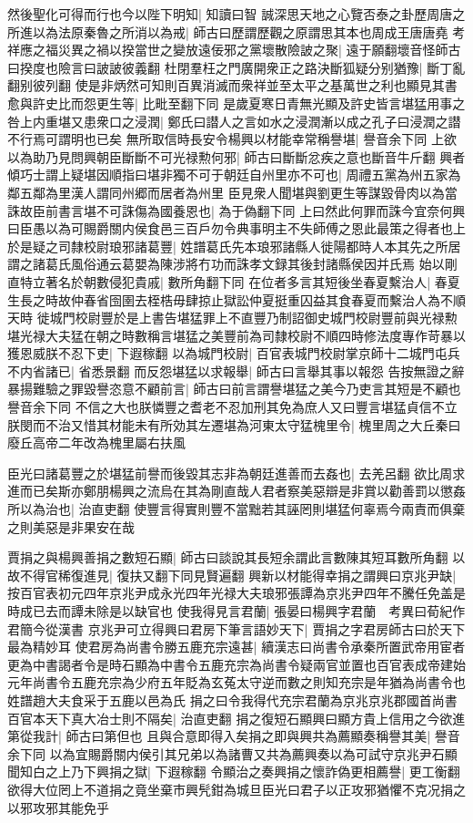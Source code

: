 然後聖化可得而行也今以陛下明知|{
	知讀曰智}
誠深思天地之心覽否泰之卦歷周唐之所進以為法原秦魯之所消以為戒|{
	師古曰歷謂歷觀之原謂思其本也周成王唐唐堯}
考祥應之福災異之禍以揆當世之變放遠佞邪之黨壞散險詖之聚|{
	遠于願翻壞音怪師古曰揆度也險言曰詖詖彼義翻}
杜閉羣枉之門廣開衆正之路決斷狐疑分别猶豫|{
	斷丁亂翻别彼列翻}
使是非炳然可知則百異消滅而衆祥並至太平之基萬世之利也顯見其書愈與許史比而怨更生等|{
	比毗至翻下同}
是歲夏寒日青無光顯及許史皆言堪猛用事之咎上内重堪又患衆口之浸潤|{
	鄭氏曰譛人之言如水之浸潤漸以成之孔子曰浸潤之譛不行焉可謂明也已矣}
無所取信時長安令楊興以材能幸常稱譽堪|{
	譽音余下同}
上欲以為助乃見問興朝臣斷斷不可光禄勲何邪|{
	師古曰斷斷忿疾之意也斷音牛斤翻}
興者傾巧士謂上疑堪因順指曰堪非獨不可于朝廷自州里亦不可也|{
	周禮五黨為州五家為鄰五鄰為里漢人謂同州郷而居者為州里}
臣見衆人聞堪與劉更生等謀毀骨肉以為當誅故臣前書言堪不可誅傷為國養恩也|{
	為于偽翻下同}
上曰然此何罪而誅今宜奈何興曰臣愚以為可賜爵關内侯食邑三百戶勿令典事明主不失師傅之恩此最策之得者也上於是疑之司隸校尉琅邪諸葛豐|{
	姓譜葛氏先本琅邪諸縣人徙陽都時人本其先之所居謂之諸葛氏風俗通云葛嬰為陳涉將冇功而誅孝文録其後封諸縣侯因并氏焉}
始以剛直特立著名於朝數侵犯貴戚|{
	數所角翻下同}
在位者多言其短後坐春夏繫治人|{
	春夏生長之時故仲春省囹圉去桎梏毋肆掠止獄訟仲夏挺重囚益其食春夏而繫治人為不順天時}
徙城門校尉豐於是上書告堪猛罪上不直豐乃制詔御史城門校尉豐前與光禄勲堪光禄大夫猛在朝之時數稱言堪猛之美豐前為司隸校尉不順四時修法度專作苛暴以獲恩威朕不忍下吏|{
	下遐稼翻}
以為城門校尉|{
	百官表城門校尉掌京師十二城門屯兵}
不内省諸已|{
	省悉景翻}
而反怨堪猛以求報舉|{
	師古曰言舉其事以報怨}
告按無證之辭暴揚難驗之罪毀譽恣意不顧前言|{
	師古曰前言謂譽堪猛之美今乃吏言其短是不顧也譽音余下同}
不信之大也朕憐豐之耆老不忍加刑其免為庶人又曰豐言堪猛貞信不立朕閔而不治又惜其材能未有所効其左遷堪為河東太守猛槐里令|{
	槐里周之大丘秦曰廢丘高帝二年改為槐里屬右扶風}


臣光曰諸葛豐之於堪猛前譽而後毀其志非為朝廷進善而去姦也|{
	去羌呂翻}
欲比周求進而已矣斯亦鄭朋楊興之流烏在其為剛直哉人君者察美惡辯是非賞以勸善罰以懲姦所以為治也|{
	治直吏翻}
使豐言得實則豐不當黜若其誣罔則堪猛何辜焉今兩責而俱棄之則美惡是非果安在哉

賈捐之與楊興善捐之數短石顯|{
	師古曰談說其長短余謂此言數陳其短耳數所角翻}
以故不得官稀復進見|{
	復扶又翻下同見賢遍翻}
興新以材能得幸捐之謂興曰京兆尹缺|{
	按百官表初元四年京兆尹成永光四年光禄大夫琅邪張譚為京兆尹四年不騰任免盖是時成已去而譚未除是以缺官也}
使我得見言君蘭|{
	張晏曰楊興字君蘭　考異曰荀紀作君簡今從漢書}
京兆尹可立得興曰君房下筆言語妙天下|{
	賈捐之字君房師古曰於天下最為精妙耳}
使君房為尚書令勝五鹿充宗遠甚|{
	續漢志曰尚書令承秦所置武帝用宦者更為中書謁者令是時石顯為中書令五鹿充宗為尚書令疑兩官並置也百官表成帝建始元年尚書令五鹿充宗為少府五年貶為玄菟太守逆而數之則知充宗是年猶為尚書令也姓譜趙大夫食采于五鹿以邑為氏}
捐之曰令我得代充宗君蘭為京兆京兆郡國首尚書百官本天下真大冶士則不隔矣|{
	治直吏翻}
捐之復短石顯興曰顯方貴上信用之今欲進第從我計|{
	師古曰第但也}
且與合意即得入矣捐之即與興共為薦顯奏稱譽其美|{
	譽音余下同}
以為宜賜爵關内侯引其兄弟以為諸曹又共為薦興奏以為可試守京兆尹石顯聞知白之上乃下興捐之獄|{
	下遐稼翻}
令顯治之奏興捐之懷詐偽更相薦譽|{
	更工衡翻}
欲得大位罔上不道捐之竟坐棄市興髠鉗為城旦臣光曰君子以正攻邪猶懼不克况捐之以邪攻邪其能免乎

